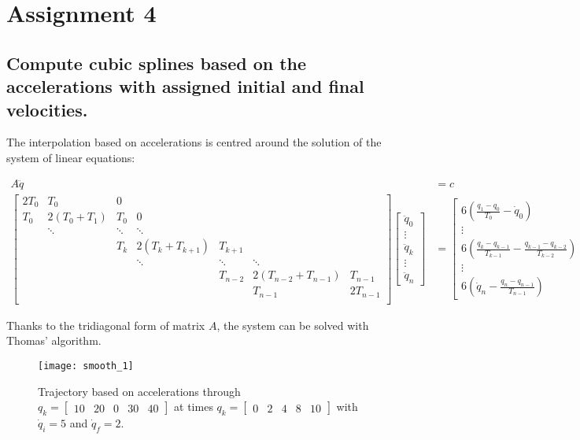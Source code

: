 \section{Assignment 4}

\subsection{Compute cubic splines based on the accelerations with assigned initial and final velocities.}

The interpolation based on accelerations is centred around the solution of the system of linear equations:

\begin{align*}
A\ddot q &= c\\
\begin{bmatrix}
2T_0 & T_0 & 0\\
T_0 & 2(T_0+T_1) & T_0 & 0\\
& \ddots & \ddots & \ddots \\
& & T_k & 2(T_k+T_{k+1}) & T_{k+1}\\
& & & \ddots & \ddots & \ddots\\
& & & & T_{n-2} & 2(T_{n-2}+T_{n-1})& T_{n-1}\\
& & & & & T_{n-1} & 2T_{n-1}\\
\end{bmatrix}\begin{bmatrix}
\ddot q_0\\\vdots\\\ddot q_k\\\vdots\\\ddot q_n
\end{bmatrix}&=\begin{bmatrix}
6\left(\frac{q_1-q_0}{T_0}-\dot q_0\right)\\
\vdots\\
6\left(\frac{q_k-q_{k-1}}{T_{k-1}}-\frac{q_{k-1}-q_{k-2}}{T_{k-2}}\right)\\
\vdots\\
6\left(\dot q_n-\frac{q_{n}-q_{n-1}}{T_{n-1}}\right)
\end{bmatrix}
\end{align*}

Thanks to the tridiagonal form of matrix $A$, the system can be solved with Thomas' algorithm.

\begin{figure}[h]
\centering
\texttt{[image: smooth\_1]}
\caption{Trajectory based on accelerations through $q_k=\begin{bmatrix}
10 & 20 & 0 & 30 & 40
\end{bmatrix}$ at times $q_k=\begin{bmatrix}
0 & 2 & 4 & 8 & 10
\end{bmatrix}$ with $\dot q_i=5$ and $\dot q_f=2$.}
\end{figure}

